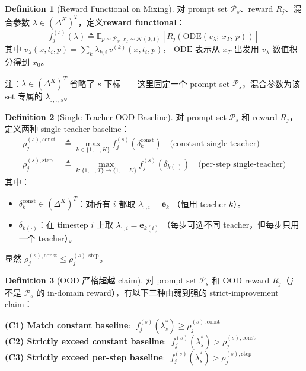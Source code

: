 \documentclass[11pt,a4paper]{article}
\newcommand{\E}{\mathbb{E}}
\newcommand{\N}{\mathcal{N}}
\newcommand{\const}{\mathrm{const}}
\theoremstyle{definition}
\newtheorem{definition}{Definition}
\begin{document}
\begin{definition}[Reward Functional on Mixing]
\label{def:reward_functional}
对 prompt set $\mathcal{P}_s$、reward $R_j$、混合参数
$\lambda \in (\Delta^K)^T$，定义\textbf{reward functional}：
\begin{equation}
f_j^{(s)}(\lambda) \triangleq \E_{p \sim \mathcal{P}_s,\, x_T \sim \N(0, I)}\!\left[
R_j\!\left(\mathrm{ODE}(v_\lambda;\, x_T,\, p)\right)
\right]
\label{eq:f_def}
\end{equation}
其中 $v_\lambda(x, t_i, p) = \sum_k \lambda_{k, i}\, v^{(k)}(x, t_i, p)$，
$\mathrm{ODE}$ 表示从 $x_T$ 出发用 $v_\lambda$ 数值积分得到 $x_0$。
\end{definition}

注：$\lambda \in (\Delta^K)^T$ 省略了 $s$ 下标——这里固定一个 prompt set
$\mathcal{P}_s$，混合参数为该 set 专属的 $\lambda_{:,:,s}$。

\begin{definition}[Single-Teacher OOD Baseline]
\label{def:ood_baseline}
对 prompt set $\mathcal{P}_s$ 和 reward $R_j$，定义两种 single-teacher baseline：
\begin{align}
\rho_j^{(s),\const} &\triangleq \max_{k \in \{1, \ldots, K\}} f_j^{(s)}(\delta_k^\const)
\quad\text{(constant single-teacher)} \label{eq:baseline_const}\\
\rho_j^{(s),\text{step}} &\triangleq \max_{k:\{1,\ldots,T\}\to\{1,\ldots,K\}}
f_j^{(s)}(\delta_{k(\cdot)}) \quad\text{(per-step single-teacher)} \label{eq:baseline_step}
\end{align}
其中：
\begin{itemize}[leftmargin=1.5em]
\item $\delta_k^\const \in (\Delta^K)^T$：对所有 $i$ 都取 $\lambda_{:,i} = \mathbf{e}_k$
（恒用 teacher $k$）。
\item $\delta_{k(\cdot)}$：在 timestep $i$ 上取 $\lambda_{:,i} = \mathbf{e}_{k(i)}$
（每步可选不同 teacher，但每步只用一个 teacher）。
\end{itemize}
\end{definition}

显然 $\rho_j^{(s),\const} \leq \rho_j^{(s),\text{step}}$。

\begin{definition}[OOD 严格超越 claim]
\label{def:ood_strict}
对 prompt set $\mathcal{P}_s$ 和 OOD reward $R_j$（$j$ 不是 $\mathcal{P}_s$ 的
in-domain reward），有以下三种由弱到强的 strict-improvement claim：

\textbf{(C1) Match constant baseline}: $\;f_j^{(s)}(\lambda_s^*) \geq \rho_j^{(s),\const}$\\
\textbf{(C2) Strictly exceed constant baseline}: $\;f_j^{(s)}(\lambda_s^*) > \rho_j^{(s),\const}$\\
\textbf{(C3) Strictly exceed per-step baseline}: $\;f_j^{(s)}(\lambda_s^*) > \rho_j^{(s),\text{step}}$
\end{definition}
\end{document}
